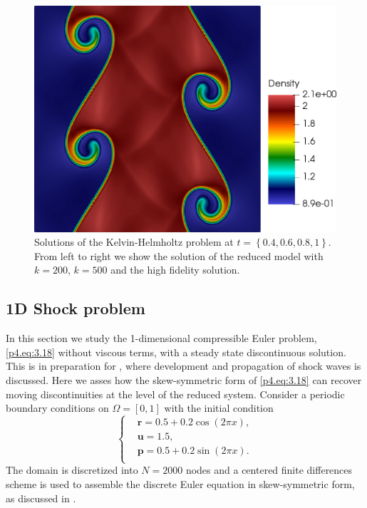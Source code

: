 \begin{figure}[h!]
\includegraphics[scale=0.115]{data/Compressible_Euler/KH/Snapshots/density_exact_768.png}

\caption{Solutions of the Kelvin-Helmholtz problem at $t=\left\{ 0.4, 0.6, 0.8, 1 \right\}$. From left to right we show the solution of the reduced model with $k=200$, $k=500$ and the high fidelity solution.}
\label{p4.fig:snap_solution_KH}
\end{figure}


\subsection{1D Shock problem}
In this section we study the 1-dimensional compressible Euler problem, \eqref{p4.eq:3.18} without viscous terms, with a steady state discontinuous solution. This is in preparation for , where development and propagation of shock waves is discussed. Here we asses how the skew-symmetric form of \eqref{p4.eq:3.18} can recover moving discontinuities at the level of the reduced system. Consider a periodic boundary conditions on $\Omega = [0,1]$ with the initial condition
\begin{equation*}
\begin{cases}
& \mathbf{r} = 0.5+0.2 \cos(2\pi x),\\
& \mathbf{u} = 1.5,\\
& \mathbf{p} = 0.5+0.2 \sin(2\pi x).\\
\end{cases}
\end{equation*}
The domain is discretized into $N=2000$ nodes and a centered finite differences scheme is used to assemble the discrete Euler equation in skew-symmetric form, as discussed in . 

